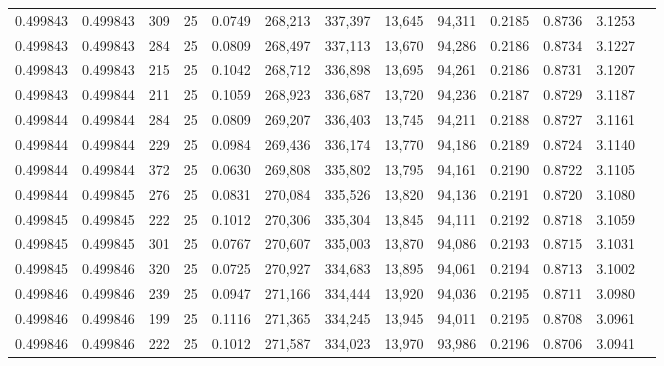 \begin{tabular}{rrrrrrrrrrrrr}
0.499843 & 0.499843 &   309 &  25 &                                     0.0749 & 268,213 & 337,397 &  13,645 &  94,311 & 0.2185 & 0.8736 & 3.1253 \\
0.499843 & 0.499843 &   284 &  25 &                                     0.0809 & 268,497 & 337,113 &  13,670 &  94,286 & 0.2186 & 0.8734 & 3.1227 \\
0.499843 & 0.499843 &   215 &  25 &                                     0.1042 & 268,712 & 336,898 &  13,695 &  94,261 & 0.2186 & 0.8731 & 3.1207 \\
0.499843 & 0.499844 &   211 &  25 &                                     0.1059 & 268,923 & 336,687 &  13,720 &  94,236 & 0.2187 & 0.8729 & 3.1187 \\
0.499844 & 0.499844 &   284 &  25 &                                     0.0809 & 269,207 & 336,403 &  13,745 &  94,211 & 0.2188 & 0.8727 & 3.1161 \\
0.499844 & 0.499844 &   229 &  25 &                                     0.0984 & 269,436 & 336,174 &  13,770 &  94,186 & 0.2189 & 0.8724 & 3.1140 \\
0.499844 & 0.499844 &   372 &  25 &                                     0.0630 & 269,808 & 335,802 &  13,795 &  94,161 & 0.2190 & 0.8722 & 3.1105 \\
0.499844 & 0.499845 &   276 &  25 &                                     0.0831 & 270,084 & 335,526 &  13,820 &  94,136 & 0.2191 & 0.8720 & 3.1080 \\
0.499845 & 0.499845 &   222 &  25 &                                     0.1012 & 270,306 & 335,304 &  13,845 &  94,111 & 0.2192 & 0.8718 & 3.1059 \\
0.499845 & 0.499845 &   301 &  25 &                                     0.0767 & 270,607 & 335,003 &  13,870 &  94,086 & 0.2193 & 0.8715 & 3.1031 \\
0.499845 & 0.499846 &   320 &  25 &                                     0.0725 & 270,927 & 334,683 &  13,895 &  94,061 & 0.2194 & 0.8713 & 3.1002 \\
0.499846 & 0.499846 &   239 &  25 &                                     0.0947 & 271,166 & 334,444 &  13,920 &  94,036 & 0.2195 & 0.8711 & 3.0980 \\
0.499846 & 0.499846 &   199 &  25 &                                     0.1116 & 271,365 & 334,245 &  13,945 &  94,011 & 0.2195 & 0.8708 & 3.0961 \\
0.499846 & 0.499846 &   222 &  25 &                                     0.1012 & 271,587 & 334,023 &  13,970 &  93,986 & 0.2196 & 0.8706 & 3.0941 \\

\end{tabular}
